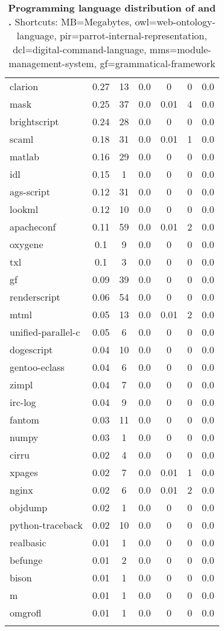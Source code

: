 \begin{longtable}{l|ccc|ccc}
clarion & 0.27 & 13 & 0.0 & 0 & 0 & 0.0 \\
mask & 0.25 & 37 & 0.0 & 0.01 & 4 & 0.0 \\
brightscript & 0.24 & 28 & 0.0 & 0 & 0 & 0.0 \\
scaml & 0.18 & 31 & 0.0 & 0.01 & 1 & 0.0 \\
matlab & 0.16 & 29 & 0.0 & 0 & 0 & 0.0 \\
idl & 0.15 & 1 & 0.0 & 0 & 0 & 0.0 \\
ags-script & 0.12 & 31 & 0.0 & 0 & 0 & 0.0 \\
lookml & 0.12 & 10 & 0.0 & 0 & 0 & 0.0 \\
apacheconf & 0.11 & 59 & 0.0 & 0.01 & 2 & 0.0 \\
oxygene & 0.1 & 9 & 0.0 & 0 & 0 & 0.0 \\
txl & 0.1 & 3 & 0.0 & 0 & 0 & 0.0 \\
gf & 0.09 & 39 & 0.0 & 0 & 0 & 0.0 \\
renderscript & 0.06 & 54 & 0.0 & 0 & 0 & 0.0 \\
mtml & 0.05 & 13 & 0.0 & 0.01 & 2 & 0.0 \\
unified-parallel-c & 0.05 & 6 & 0.0 & 0 & 0 & 0.0 \\
dogescript & 0.04 & 10 & 0.0 & 0 & 0 & 0.0 \\
gentoo-eclass & 0.04 & 6 & 0.0 & 0 & 0 & 0.0 \\
zimpl & 0.04 & 7 & 0.0 & 0 & 0 & 0.0 \\
irc-log & 0.04 & 9 & 0.0 & 0 & 0 & 0.0 \\
fantom & 0.03 & 11 & 0.0 & 0 & 0 & 0.0 \\
numpy & 0.03 & 1 & 0.0 & 0 & 0 & 0.0 \\
cirru & 0.02 & 4 & 0.0 & 0 & 0 & 0.0 \\
xpages & 0.02 & 7 & 0.0 & 0.01 & 1 & 0.0 \\
nginx & 0.02 & 6 & 0.0 & 0.01 & 2 & 0.0 \\
objdump & 0.02 & 1 & 0.0 & 0 & 0 & 0.0 \\
python-traceback & 0.02 & 10 & 0.0 & 0 & 0 & 0.0 \\
realbasic & 0.01 & 1 & 0.0 & 0 & 0 & 0.0 \\
befunge & 0.01 & 2 & 0.0 & 0 & 0 & 0.0 \\
bison & 0.01 & 1 & 0.0 & 0 & 0 & 0.0 \\
m & 0.01 & 1 & 0.0 & 0 & 0 & 0.0 \\
omgrofl & 0.01 & 1 & 0.0 & 0 & 0 & 0.0 \\
    \bottomrule
\caption{\textbf{Programming language distribution of \data{} and \dataft{}.} Shortcuts: MB=Megabytes, owl=web-ontology-language, pir=parrot-internal-representation, dcl=digital-command-language, mms=module-management-system, gf=grammatical-framework}
    \label{tab:data}
\end{longtable}    




